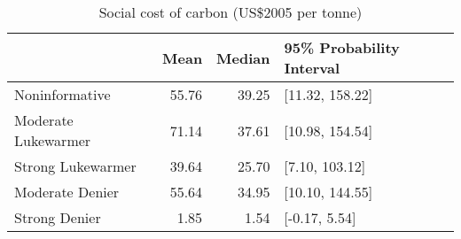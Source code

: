\begin{table}[t]
\centering
\caption{Social cost of carbon (US\$2005 per tonne)} 
\label{tab:scc}
\begin{tabular}{lrrl}
  \toprule
 & Mean & Median & 95\% Probability Interval \\ 
  \midrule
Noninformative & 55.76 & 39.25 & [11.32, 158.22] \\ 
  Moderate Lukewarmer & 71.14 & 37.61 & [10.98, 154.54] \\ 
  Strong Lukewarmer & 39.64 & 25.70 & [7.10, 103.12] \\ 
  Moderate Denier & 55.64 & 34.95 & [10.10, 144.55] \\ 
  Strong Denier & 1.85 & 1.54 & [-0.17, 5.54] \\ 
   \bottomrule
\end{tabular}
\end{table}
